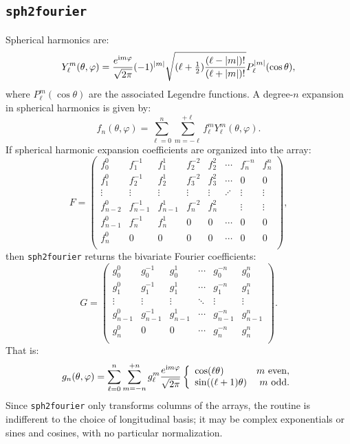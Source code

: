 \documentclass{article}
\def\ii{{\rm i}}
\def\abs#1{\left|{#1}\right|}
\begin{document}
\subsection{{\tt sph2fourier}}

Spherical harmonics are:
\begin{equation}
Y_\ell^m(\theta,\varphi) = \frac{e^{\ii m\varphi}}{\sqrt{2\pi}} (-1)^{\abs{m}}\sqrt{(\ell+\tfrac{1}{2})\frac{(\ell-\abs{m})!}{(\ell+\abs{m})!}} P_\ell^{\abs{m}}(\cos\theta),
\end{equation}
where $P_\ell^m(\cos\theta)$ are the associated Legendre functions. A degree-$n$ expansion in spherical harmonics is given by:
\begin{equation}
f_n(\theta,\varphi) = \sum_{\ell=0}^{n}\sum_{m=-\ell}^{+\ell} f_\ell^m Y_\ell^m(\theta,\varphi).
\end{equation}
If spherical harmonic expansion coefficients are organized into the array:
\begin{equation}
F = \begin{pmatrix}
f_0^0 & f_1^{-1} & f_1^1 & f_2^{-2} & f_2^2 & \cdots & f_n^{-n} & f_n^n\\
f_1^0 & f_2^{-1} & f_2^1 & f_3^{-2} & f_3^2 & \cdots & 0 & 0\\
\vdots & \vdots & \vdots &  \vdots &  \vdots & \iddots & \vdots & \vdots\\
f_{n-2}^0 & f_{n-1}^{-1} & f_{n-1}^1 & f_n^{-2} & f_n^2 &  & \vdots & \vdots\\
f_{n-1}^0 & f_n^{-1} & f_n^1 & 0 & 0 & \cdots & 0 & 0\\
f_n^0 & 0 & 0 & 0 & 0 & \cdots & 0 & 0\\
\end{pmatrix},
\end{equation}
then {\tt sph2fourier} returns the bivariate Fourier coefficients:
\begin{equation}
G = \begin{pmatrix}
g_0^0 & g_0^{-1} & g_0^1 & \cdots & g_0^{-n} & g_0^n\\
g_1^0 & g_1^{-1} & g_1^1 & \cdots & g_1^{-n} & g_1^n\\
\vdots & \vdots & \vdots & \ddots & \vdots & \vdots\\
g_{n-1}^0 & g_{n-1}^{-1} & g_{n-1}^1& \cdots & g_{n-1}^{-n} & g_{n-1}^n\\
g_n^0 & 0 & 0 & \cdots & g_n^{-n} & g_n^n\\
\end{pmatrix}.
\end{equation}
That is:
\begin{equation}
g_n(\theta,\varphi) = \sum_{\ell=0}^n\sum_{m=-n}^{+n} g_\ell^m \frac{e^{\ii m\varphi}}{\sqrt{2\pi}} \left\{\begin{array}{lr} \cos(\ell\theta) & m~{\rm even},\\ \sin((\ell+1)\theta) & m~{\rm odd}.\end{array}\right.
\end{equation}
Since {\tt sph2fourier} only transforms columns of the arrays, the routine is indifferent to the choice of longitudinal basis; it may be complex exponentials or sines and cosines, with no particular normalization.
\end{document}
